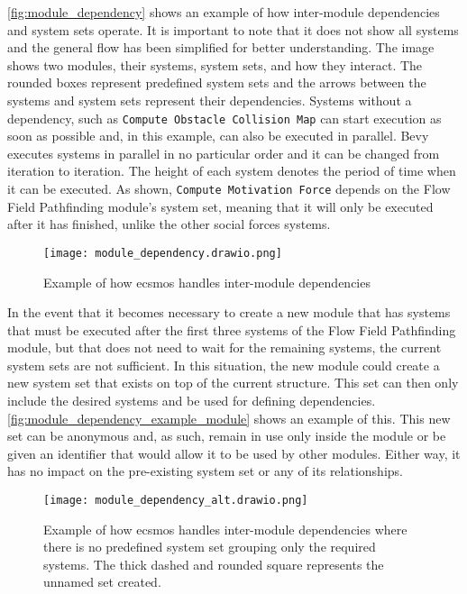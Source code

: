 \documentclass[twoside, 11pt]{article}
\begin{document}
\autoref{fig:module_dependency} shows an example of how inter-module dependencies and system sets operate. It is important to note that it does not show all systems and the general flow has been simplified for better understanding. The image shows two modules, their systems, system sets, and how they interact. The rounded boxes represent predefined system sets and the arrows between the systems and system sets represent their dependencies. Systems without a dependency, such as \verb|Compute Obstacle Collision Map| can start execution as soon as possible and, in this example, can also be executed in parallel. Bevy executes systems in parallel in no particular order and it can be changed from iteration to iteration. The height of each system denotes the period of time when it can be executed. As shown, \verb|Compute Motivation Force| depends on the Flow Field Pathfinding module's system set, meaning that it will only be executed after it has finished, unlike the other social forces systems.

\begin{figure}[h]
  \centering
  \texttt{[image: module\_dependency.drawio.png]}
  \caption[Example of how ECSMoS handles inter-module dependencies]{Example of how \gls{ecsmos} handles inter-module dependencies}
  \label{fig:module_dependency}
\end{figure}

In the event that it becomes necessary to create a new module that has systems that must be executed after the first three systems of the Flow Field Pathfinding module, but that does not need to wait for the remaining systems, the current system sets are not sufficient. In this situation, the new module could create a new system set that exists on top of the current structure. This set can then only include the desired systems and be used for defining dependencies. 
\autoref{fig:module_dependency_example_module} shows an example of this. This new set can be anonymous and, as such, remain in use only inside the module or be given an identifier that would allow it to be used by other modules. Either way, it has no impact on the pre-existing system set or any of its relationships.

\begin{figure}[h]
  \centering
  \texttt{[image: module\_dependency\_alt.drawio.png]}
  \caption[Example of how ECSMoS handles the addition of systems with dependencies]{Example of how \gls{ecsmos} handles inter-module dependencies where there is no predefined system set grouping only the required systems. The thick dashed and rounded square represents the unnamed set created.}
  \label{fig:module_dependency_example_module}
\end{figure}
\end{document}
